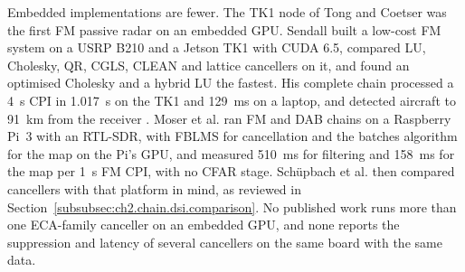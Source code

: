 Embedded implementations are fewer. The TK1 node of Tong and Coetser \citep{tong2015} was the first FM passive radar on an embedded GPU. Sendall \citep{sendall2016} built a low-cost FM system on a USRP B210 and a Jetson TK1 with CUDA 6.5, compared LU, Cholesky, QR, CGLS, CLEAN and lattice cancellers on it, and found an optimised Cholesky and a hybrid LU the fastest. His complete chain processed a 4~s CPI in 1.017~s on the TK1 and 129~ms on a laptop, and detected aircraft to 91~km from the receiver \citep{sendall2016}. Moser et al. \citep{moser2019} ran FM and DAB chains on a Raspberry Pi~3 with an RTL-SDR, with FBLMS for cancellation and the batches algorithm for the map on the Pi's GPU, and measured 510~ms for filtering and 158~ms for the map per 1~s FM CPI, with no CFAR stage. Schüpbach et al. \citep{schuepbach2020} then compared cancellers with that platform in mind, as reviewed in Section~\ref{subsubsec:ch2.chain.dsi.comparison}. No published work runs more than one ECA-family canceller on an embedded GPU, and none reports the suppression and latency of several cancellers on the same board with the same data.




